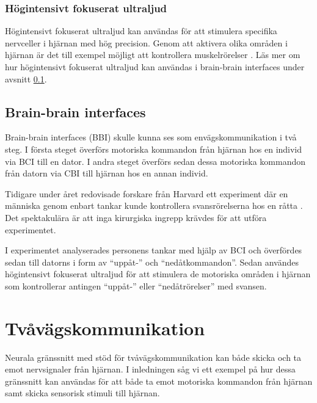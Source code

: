 \documentclass[12pt, a4paper]{article}
\begin{document}

\subsubsection{Högintensivt fokuserat ultraljud}

Högintensivt fokuserat ultraljud kan användas för att stimulera specifika nervceller i hjärnan med hög precision. Genom att aktivera olika områden i hjärnan är det till exempel möjligt att kontrollera muskelrörelser \cite{bbi}. Läs mer om hur högintensivt fokuserat ultraljud kan användas i brain-brain interfaces under avsnitt \ref{BBI}.


\subsection{Brain-brain interfaces}
\label{BBI}

Brain-brain interfaces (BBI) skulle kunna ses som envägskommunikation i två steg. I första steget överförs motoriska kommandon från hjärnan hos en individ via BCI till en dator. I andra steget överförs sedan dessa motoriska kommandon från datorn via CBI till hjärnan hos en annan individ.

Tidigare under året redovisade forskare från Harvard ett experiment där en människa genom enbart tankar kunde kontrollera svansrörelserna hos en råtta \cite{bbi}. Det spektakulära är att inga kirurgiska ingrepp krävdes för att utföra experimentet.

I experimentet analyserades personens tankar med hjälp av BCI och överfördes sedan till datorns i form av ``uppåt-'' och ``nedåtkommandon''. Sedan användes högintensivt fokuserat ultraljud för att stimulera de motoriska områden i hjärnan som kontrollerar antingen ``uppåt-'' eller ``nedåtrörelser'' med svansen.


\section{Tvåvägskommunikation}

Neurala gränssnitt med stöd för tvåvägskommunikation kan både skicka och ta emot nervsignaler från hjärnan. I inledningen såg vi ett exempel på hur dessa gränssnitt kan användas för att både ta emot motoriska kommandon från hjärnan samt skicka sensorisk stimuli till hjärnan.
\end{document}
